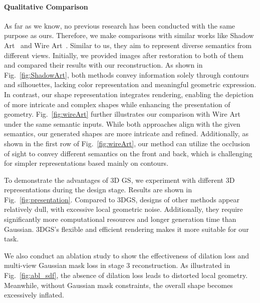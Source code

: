 

\paragraph{Qualitative Comparison}
As far as we know, no previous research has been conducted with the same purpose as ours. Therefore, we make comparisons with similar works like Shadow Art~\cite{MP09} and Wire Art~\cite{Fabricable3DWireArt}. Similar to us, they aim to represent diverse semantics from different views. Initially, we provided images after restoration to both of them and compared their results with our reconstruction. As shown in Fig.~\ref{fig:ShadowArt}, both methods convey information solely through contours and silhouettes, lacking color representation and meaningful geometric expression. In contrast, our shape representation integrates rendering, enabling the depiction of more intricate and complex shapes while enhancing the presentation of geometry. Fig.~\ref{fig:wireArt} further illustrates our comparison with Wire Art under the same semantic inputs. While both approaches align with the given semantics, our generated shapes are more intricate and refined. Additionally, as shown in the first row of Fig.~\ref{fig:wireArt}, our method can utilize the occlusion of sight to convey different semantics on the front and back, which is challenging for simpler representations based mainly on contours.

To demonstrate the advantages of 3D GS, we experiment with different 3D representations during the design stage. Results are shown in Fig.~\ref{fig:presentation}. Compared to 3DGS, designs of other methods appear relatively dull, with excessive local geometric noise. Additionally, they require significantly more computational resources and longer generation time than Gaussian. 3DGS's flexible and efficient rendering makes it more suitable for our task.



We also conduct an ablation study to show the effectiveness of dilation loss and multi-view Gaussian mask loss in stage 3 reconstruction. As illustrated in Fig.~\ref{fig:abl_sdf}, the absence of dilation loss leads to distorted local geometry. Meanwhile, without Gaussian mask constraints, the overall shape becomes excessively inflated. 